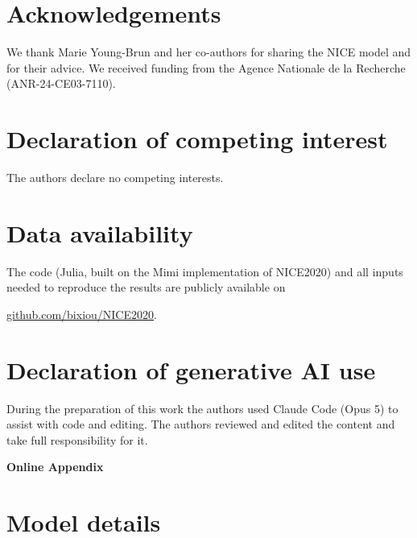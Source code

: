\documentclass[12pt,english]{article}
\newif\ifblind
\theoremstyle{remark}
\begin{document}
\section*{Acknowledgements}
We thank Marie Young-Brun and her co-authors for sharing the NICE model and for their advice. We received funding from the Agence Nationale de la Recherche (ANR-24-CE03-7110). %
\fi

\section*{Declaration of competing interest}
The authors declare no competing interests.

\section*{Data availability}

The code (Julia, built on the Mimi implementation of NICE2020) and all inputs needed to reproduce the results are publicly available on 
\ifblind
[anonymized for review]
\else
\href{https://github.com/bixiou/NICE2020/tree/main/cap_and_share}{github.com/bixiou/NICE2020}.
\fi

\section*{Declaration of generative AI use}
During the preparation of this work the authors used Claude Code (Opus 5) to assist with code and editing. The authors reviewed and edited the content and take full responsibility for it.

\singlespacing
\ifblind
  
\else
  
\fi

\clearpage
\appendix
\nolinenumbers
\setcounter{table}{0}
\renewcommand{\thetable}{A\arabic{table}}
\setcounter{figure}{0}
\renewcommand{\thefigure}{A\arabic{figure}}
\begin{center}\Large\bfseries Online Appendix\end{center}

\section{Model details}
\label{app:model}
\end{document}
